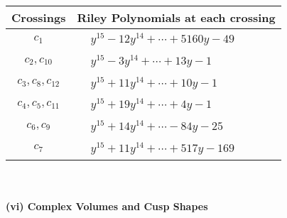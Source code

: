 \documentclass[1p]{elsarticle_modified}
\theoremstyle{definition}
\begin{document}
\begin{tabular}{m{50pt}|m{274pt}}
Crossings & \hspace{64pt}Riley Polynomials at each crossing \\
\hline $$\begin{aligned}c_{1}\end{aligned}$$&$\begin{aligned}
&y^{15}-12 y^{14}+\cdots+5160 y-49
\end{aligned}$\\
\hline $$\begin{aligned}c_{2},c_{10}\end{aligned}$$&$\begin{aligned}
&y^{15}-3 y^{14}+\cdots+13 y-1
\end{aligned}$\\
\hline $$\begin{aligned}c_{3},c_{8},c_{12}\end{aligned}$$&$\begin{aligned}
&y^{15}+11 y^{14}+\cdots+10 y-1
\end{aligned}$\\
\hline $$\begin{aligned}c_{4},c_{5},c_{11}\end{aligned}$$&$\begin{aligned}
&y^{15}+19 y^{14}+\cdots+4 y-1
\end{aligned}$\\
\hline $$\begin{aligned}c_{6},c_{9}\end{aligned}$$&$\begin{aligned}
&y^{15}+14 y^{14}+\cdots-84 y-25
\end{aligned}$\\
\hline $$\begin{aligned}c_{7}\end{aligned}$$&$\begin{aligned}
&y^{15}+11 y^{14}+\cdots+517 y-169
\end{aligned}$\\
\hline
\end{tabular}\\~\\
\newpage\flushleft \textbf{(vi) Complex Volumes and Cusp Shapes}
\end{document}
